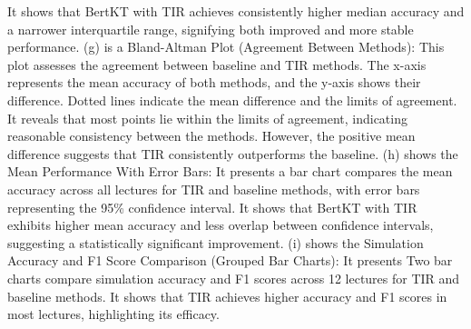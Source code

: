 \begin{figure*}
{It shows that BertKT with TIR achieves consistently higher median accuracy and a narrower interquartile range, signifying both improved and more stable performance.
(g) is a Bland-Altman Plot (Agreement Between Methods):
This plot assesses the agreement between baseline and TIR methods. The x-axis represents the mean accuracy of both methods, and the y-axis shows their difference. Dotted lines indicate the mean difference and the limits of agreement.
It reveals that most points lie within the limits of agreement, indicating reasonable consistency between the methods. However, the positive mean difference suggests that TIR consistently outperforms the baseline.
(h) shows the Mean Performance With Error Bars:
It presents a bar chart compares the mean accuracy across all lectures for TIR and baseline methods, with error bars representing the 95\% confidence interval.
It shows that BertKT with TIR exhibits higher mean accuracy and less overlap between confidence intervals, suggesting a statistically significant improvement.
(i) shows the Simulation Accuracy and F1 Score Comparison (Grouped Bar Charts):
It presents Two bar charts compare simulation accuracy and F1 scores across 12 lectures for TIR and baseline methods.
It shows that TIR achieves higher accuracy and F1 scores in most lectures, highlighting its efficacy. 
}
\label{lecture correlation}
\end{figure*}






